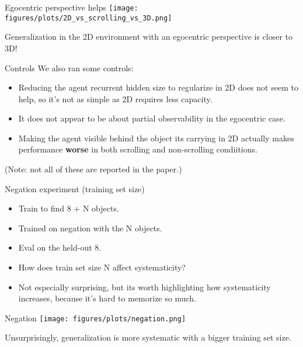 \documentclass{beamer}
\begin{document}
\begin{frame}{Egocentric perspective helps}
\vspace{1em}
\centering
\texttt{[image: figures/plots/2D\_vs\_scrolling\_vs\_3D.png]}
\end{frame}

\begin{frame}[standout]
Generalization in the 2D environment with an egocentric perspective is closer to 3D!
\end{frame}

\begin{frame}{Controls}
We also ran some controls:
\begin{itemize}
\item Reducing the agent recurrent hidden size to regularize in 2D does not seem to help, so it's not as simple as 2D requires less capacity. 
\item It does not appear to be about partial observability in the egocentric case.
\item Making the agent visible behind the object its carrying in 2D actually makes performance \textbf{worse} in both scrolling and non-scrolling condiitions.
\end{itemize}
(Note: not all of these are reported in the paper.)
\end{frame}

\begin{frame}{Negation experiment (training set size)}
\begin{itemize}
\item Train to find 8 + N objects.
\item Trained on negation with the N objects.
\item Eval on the held-out 8.
\item How does train set size N affect systematicity?
\item Not especially surprising, but its worth highlighting how systematicity increases, because it's hard to memorize so much.
\end{itemize}
\end{frame}

\begin{frame}{Negation}
\vspace{1em}
\centering
\texttt{[image: figures/plots/negation.png]}
\end{frame}

\begin{frame}[standout]
Unsurprisingly, generalization is more systematic with a bigger training set size.
\end{frame}
\end{document}
